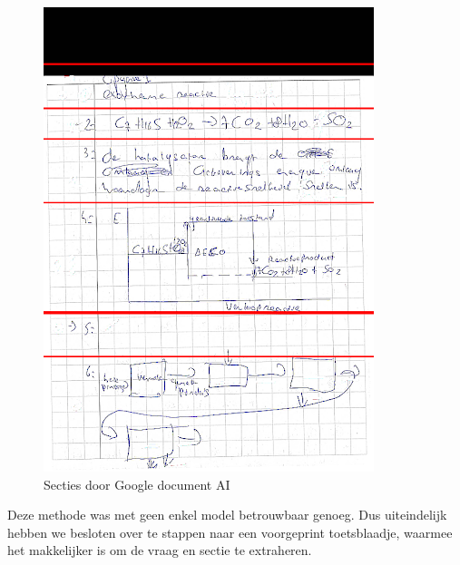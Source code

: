 \documentclass[12pt]{article}
\begin{document}
\begin{multicols}{2}
\begin{figure}
    \includegraphics[width=1\linewidth]{./images/methoden/inscannen/sectie/hand/section.png}
    \caption{Secties door Google document AI}\label{fig:sec-google-doc-api}
\end{figure}
Deze methode was met geen enkel model betrouwbaar genoeg.
Dus uiteindelijk hebben we besloten over te stappen naar een voorgeprint toetsblaadje, waarmee het makkelijker is  om de vraag en sectie te extraheren.
\end{multicols} 
\pagebreak
\end{document}
